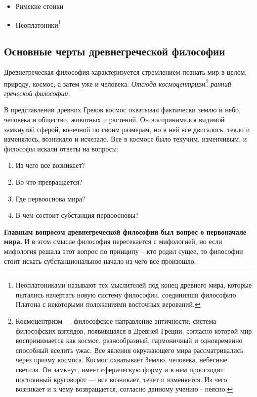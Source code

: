 \documentclass[a4paper, 14pt]{extreport}
\begin{document}
\begin{enumerate}
  \begin{itemize}
  
  \item
    Римские стоики
  \item
    Неоплатоники\footnote{Неоплатониками называют тех мыслителей под
      конец древнего мира, которые пытались начертать новую систему
      философии, соединивши философию Платона с некоторыми положениями
      восточных верований.}
  \end{itemize}
\end{enumerate}

\subsection{Основные черты древнегреческой философии}

Древнегреческая философия характеризуется стремлением познать мир в
целом, природу, космос, а затем уже и человека. \emph{Отсюда
космоцентризм\footnote{Космоцентризм --- философское направление
  античности, система философских взглядов, появившаяся в Древней
  Греции, согласно которой мир воспринимается как космос, разнообразный,
  гармоничный и одновременно способный вселить ужас. Все явления
  окружающего мира рассматривались через призму космоса. Космос
  охватывает Землю, человека, небесные светила. Он замкнут, имеет
  сферическую форму и в нем происходит постоянный круговорот --- все
  возникает, течет и изменяется. Из чего возникает и к чему
  возвращается, согласно данному учению - неясно.} ранний греческой
философии.}

В представлении древних Греков космос охватывал фактически землю и небо,
человека и общество, животных и растений. Он воспринимался видимой
замкнутой сферой, конечной по своим размерам, но в ней все двигалось,
текло и изменялось, возникало и исчезало. Все в космосе было текучим,
изменчивым, и философы искали ответы на вопросы:

\begin{enumerate}
\def\labelenumi{\arabic{enumi}.}

\item
  Из чего все возникает?
\item
  Во что превращается?
\item
  Где первооснова мира?
\item
  В чем состоит субстанция первоосновы?
\end{enumerate}

\textbf{Главным вопросом древнегреческой философии был вопрос о
первоначале мира.} И в этом смысле философия пересекается с мифологией,
но если мифология решала этот вопрос по принципу -- кто родил сущее, то
философии стоит искать субстанциональное начало из чего все произошло.
\end{document}
